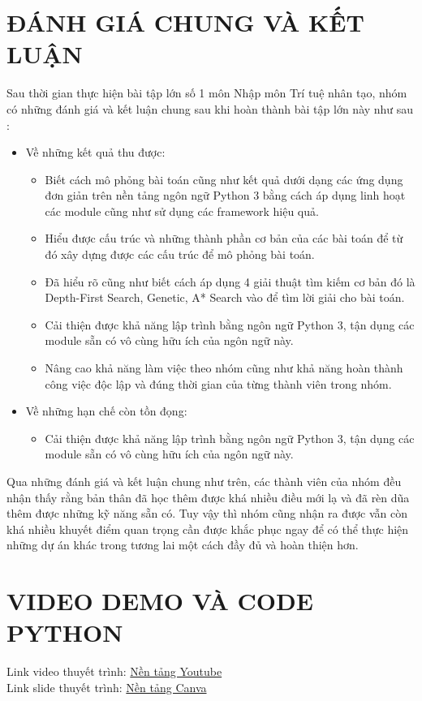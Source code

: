 \documentclass[a4paper]{article}
\begin{document}

\newpage
\tableofcontents
\newpage

\newpage

\newpage

\newpage

\newpage

\newpage

\newpage
\section{ĐÁNH GIÁ CHUNG VÀ KẾT LUẬN}
Sau thời gian thực hiện bài tập lớn số 1 môn Nhập môn Trí tuệ nhân tạo, nhóm có những đánh giá và kết luận chung sau khi hoàn thành bài tập lớn này như sau :
\begin{itemize}
    \item Về những kết quả thu được:
    \begin{itemize}
        \item Biết cách mô phỏng bài toán cũng như kết quả dưới dạng các ứng dụng đơn giản trên nền tảng ngôn ngữ Python 3 bằng cách áp dụng linh hoạt các module cũng như sử dụng các framework hiệu quả.
        \item Hiểu được cấu trúc và những thành phần cơ bản của các bài toán để từ đó xây dựng được các cấu trúc để mô phỏng bài toán. 
        \item Đã hiểu rõ cũng như biết cách áp dụng 4 giải thuật tìm kiếm cơ bản đó là Depth-First Search, Genetic, A* Search  vào để tìm lời giải cho bài toán.
        \item Cải thiện được khả năng lập trình bằng ngôn ngữ Python 3, tận dụng các module sẵn có vô cùng hữu ích của ngôn ngữ này. 
        \item Nâng cao khả năng làm việc theo nhóm cũng như khả năng hoàn thành công việc độc lập và đúng thời gian của từng thành viên trong nhóm. 
    \end{itemize}
    \item Về những hạn chế còn tồn đọng:
    \begin{itemize}
        \item Cải thiện được khả năng lập trình bằng ngôn ngữ Python 3, tận dụng các module sẵn có vô cùng hữu ích của ngôn ngữ này.
    \end{itemize}
\end{itemize}
Qua những đánh giá và kết luận chung như trên, các thành viên của nhóm đều nhận thấy rằng bản thân đã học thêm được khá nhiều điều mới lạ và đã rèn dũa thêm được những kỹ năng sẵn có. Tuy vậy thì nhóm cũng nhận ra được vẫn còn khá nhiều khuyết điểm quan trọng cần được khắc phục ngay để có thể thực hiện những dự án khác trong tương lai một cách đầy đủ và hoàn thiện hơn. 
\section{VIDEO DEMO VÀ CODE PYTHON}
Link video thuyết trình: \href{}{Nền tảng Youtube}\\
Link slide thuyết trình: \href{}{Nền tảng Canva}
\begin{thebibliography}{99999}

\end{thebibliography}
\end{document}
